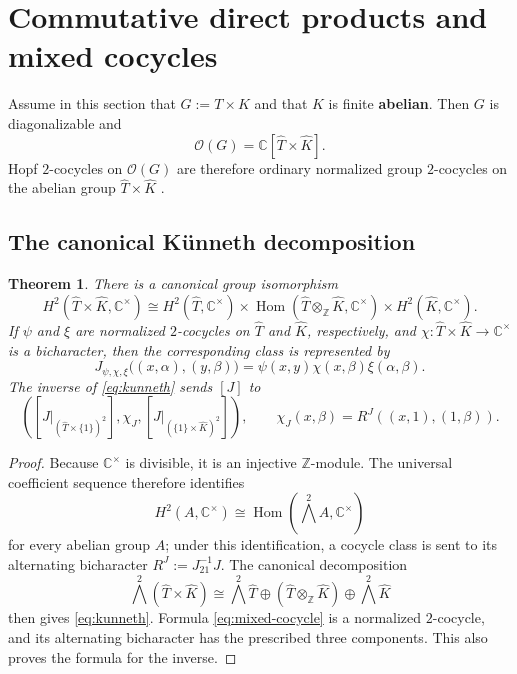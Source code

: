 \documentclass{amsart}
\newtheorem{theorem}{Theorem}[section]
\theoremstyle{definition}
\newcommand{\Hom}{\operatorname{Hom}}
\newcommand{\Ctimes}{\mathbb{C}^{\times}}
\numberwithin{equation}{section}
\begin{document}
\section{Commutative direct products and mixed cocycles}
\label{sec:commutative-direct-products}

Assume in this section that $G:=T\times K$ and that $K$ is finite {\bf abelian}.  Then $G$
is diagonalizable and
\[
 \mathscr{O}(G)=\mathbb{C}[\widehat T\times \widehat K].
\]
Hopf $2$-cocycles on $\mathscr{O}(G)$ are therefore ordinary normalized group $2$-cocycles on the
abelian group $\widehat T\times \widehat K$ \cite{G1}.

\subsection{The canonical K\"unneth decomposition}

\begin{theorem}\label{thm:kunneth}
There is a canonical group isomorphism
\begin{equation}\label{eq:kunneth}
 H^2(\widehat T\times \widehat K,\Ctimes)
 \cong
 H^2(\widehat T,\Ctimes)
 \times \Hom(\widehat T\otimes_{\mathbb Z}\widehat K,\Ctimes)
 \times H^2(\widehat K,\Ctimes).
\end{equation}
If $\psi$ and $\xi$ are normalized $2$-cocycles on $\widehat T$ and $\widehat K$, respectively, and
$\chi:\widehat T\times \widehat K\to\Ctimes$ is a bicharacter, then the corresponding class is
represented by
\begin{equation}\label{eq:mixed-cocycle}
 J_{\psi,\chi,\xi}\bigl((x,\alpha),(y,\beta)\bigr)
 =\psi(x,y)\chi(x,\beta)\xi(\alpha,\beta).
\end{equation}
The inverse of \eqref{eq:kunneth} sends $[J]$ to
\[
 \left(
 [J|_{(\widehat T\times\{1\})^2}],
 \chi_J,
 [J|_{(\{1\}\times \widehat K)^2}]
 \right),
 \qquad
 \chi_J(x,\beta)=R^J((x,1),(1,\beta)).
\]
\end{theorem}

\begin{proof}
Because $\Ctimes$ is divisible, it is an injective $\mathbb Z$-module.  The
universal coefficient sequence therefore identifies
\[
 H^2(A,\Ctimes)\cong\Hom(\textstyle\bigwedge^2 A,\Ctimes)
\]
for every abelian group $A$; under this identification, a cocycle class is sent to
its alternating bicharacter $R^J:=J_{21}^{-1}J$.  The canonical decomposition
\[
 \bigwedge^2(\widehat T\times \widehat K)
 \cong
 \bigwedge^2\widehat T\oplus(\widehat T\otimes_{\mathbb Z}\widehat K)\oplus\bigwedge^2\widehat K
\]
then gives \eqref{eq:kunneth}.  Formula \eqref{eq:mixed-cocycle} is a normalized
$2$-cocycle, and its alternating bicharacter has the prescribed three components.
This also proves the formula for the inverse.
\end{proof}
\end{document}
